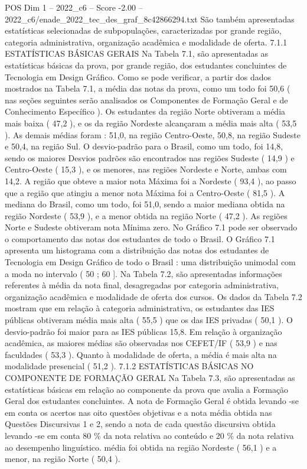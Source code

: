 \begin{textsample}{POS Dim 1 – 2022\_c6 – Score -2.00 – 2022\_c6/enade\_2022\_tec\_des\_graf\_8c42866294.txt}
São também apresentadas estatísticas selecionadas de subpopulações, caracterizadas por grande região, categoria administrativa, organização acadêmica e modalidade de oferta. 7.1.1 ESTATÍSTICAS BÁSICAS GERAIS Na Tabela 7.1, são apresentadas as estatísticas básicas da prova, por grande região, dos estudantes concluintes de Tecnologia em Design Gráfico.
Como se pode verificar, a partir dos dados mostrados na Tabela 7.1, a média das notas da prova, como um todo foi 50,6 ( nas seções seguintes serão analisados os Componentes de Formação Geral e de Conhecimento Específico ).
Os estudantes da região Norte obtiveram a média mais baixa ( 47,2 ), e os da região Nordeste alcançaram a média mais alta ( 53,5 ).
As demais médias foram : 51,0, na região Centro-Oeste, 50,8, na região Sudeste e 50,4, na região Sul.
O desvio-padrão para o Brasil, como um todo, foi 14,8, sendo os maiores Desvios padrões são encontrados nas regiões Sudeste ( 14,9 ) e Centro-Oeste ( 15,3 ), e os menores, nas regiões Nordeste e Norte, ambas com 14,2.
A região que obteve a maior nota Máxima foi a Nordeste ( 93,4 ), ao passo que a região que atingiu a menor nota Máxima foi a Centro-Oeste ( 81,5 ).
A mediana do Brasil, como um todo, foi 51,0, sendo a maior mediana obtida na região Nordeste ( 53,9 ), e a menor obtida na região Norte ( 47,2 ).
As regiões Norte e Sudeste obtiveram nota Mínima zero.
No Gráfico 7.1 pode ser observado o comportamento das notas dos estudantes de todo o Brasil.
O Gráfico 7.1 apresenta um histograma com a distribuição das notas dos estudantes de Tecnologia em Design Gráfico de todo o Brasil : uma distribuição unimodal com a moda no intervalo ( 50 ; 60 ].
Na Tabela 7.2, são apresentadas informações referentes à média da nota final, desagregadas por categoria administrativa, organização acadêmica e modalidade de oferta dos cursos.
Os dados da Tabela 7.2 mostram que em relação à categoria administrativa, os estudantes das IES públicas obtiveram média mais alta ( 55,5 ) que os das IES privadas ( 50,1 ).
O desvio-padrão foi maior para as IES públicas 15,8.
Em relação à organização acadêmica, as maiores médias são observadas nos CEFET/IF ( 53,9 ) e nas faculdades ( 53,3 ).
Quanto à modalidade de oferta, a média é mais alta na modalidade presencial ( 51,2 ). 7.1.2 ESTATÍSTICAS BÁSICAS NO COMPONENTE DE FORMAÇÃO GERAL Na Tabela 7.3, são apresentadas as estatísticas básicas em relação ao componente da prova que avalia a Formação Geral dos estudantes concluintes.
A nota de Formação Geral é obtida levando -se em conta os acertos nas oito questões objetivas e a nota média obtida nas Questões Discursivas 1 e 2, sendo a nota de cada questão discursiva obtida levando -se em conta 80 \% da nota relativa ao conteúdo e 20 \% da nota relativa ao desempenho linguístico. média foi obtida na região Nordeste ( 56,1 ) e a menor, na região Norte ( 50,4 ).

\end{textsample}
